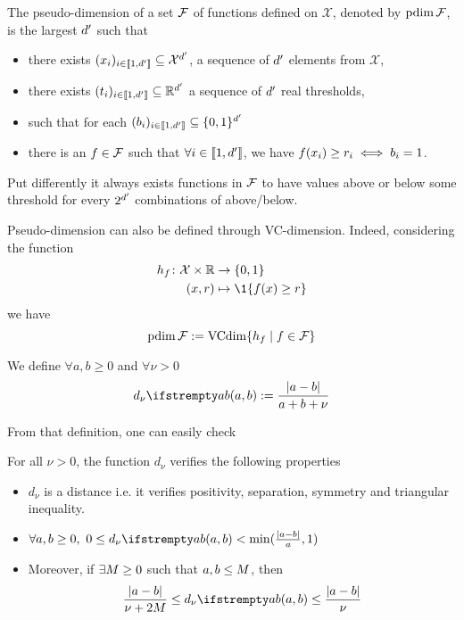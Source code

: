 \begin{tcolorbox}
	\begin{definition}
		The pseudo-dimension of a set $\mathcal{F}$ of functions defined on $\mathcal{X}$, denoted by $\operatorname{pdim}\mathcal{F}$, is the largest ${d^{\prime}}$ such that 
	\begin{itemize}
		\item there exists $(x_{i})_{i\in \llbracket 1,{d^{\prime}} \rrbracket} \subseteq \mathcal{X}^{d^{\prime}}$, a sequence of ${d^{\prime}}$ elements from $\mathcal{X}$,
		\item there exists $(t_i)_{i\in \llbracket 1,{d^{\prime}} \rrbracket} \subseteq  \mathbb{R}^{d^{\prime}}$ a sequence of ${d^{\prime}}$ real thresholds,
		\item such that for each $(b_i)_{i\in \llbracket 1,{d^{\prime}} \rrbracket} \subseteq \{0,1\}^{d^{\prime}}$
		\item there is an $f \in \mathcal{F}$ such that $\forall i \in \llbracket 1,{d^{\prime}} \rrbracket$, we have $f(x_i) \geq r_i \iff b_i = 1$. 
	\end{itemize}
	Put differently it always exists functions in $\mathcal{F}$ to have values above or below some threshold for every $2^{d^{\prime}}$ combinations of above/below.
\end{definition}
Pseudo-dimension can also be defined through VC-dimension. Indeed, considering the function
\begin{align*}
	h_\query \colon \mathcal{X} \times \RR &\to \{0,1\}\\
	(x,r) &\mapsto \1\{f(x) \geq r\}
\end{align*}
we have
\begin{equation}
	\operatorname{pdim}\mathcal{F} := \operatorname{VCdim}\{h_f \mid f \in \mathcal{F}\}
\end{equation}
\end{tcolorbox}




\begin{tcolorbox}[colback=red!10,title= Useless?]
	We define $\forall a,b \geq 0$ and $\forall \nu >0$
	\begin{equation}
		\dnu{\nu}{a}{b} := \frac{|a-b|}{a+b+\nu}
	\end{equation}
	
	From that definition, one can easily check
	\begin{proposition}
		\label{prop_dnu}
		For all $\nu>0$, the function $d_\nu$ verifies the following properties
		\begin{itemize}
			\item $d_\nu$ is a distance i.e. it verifies positivity, separation, symmetry and triangular inequality.
			\item $\forall a,b \geq 0,\ 0\leq \dnu{\nu}{a}{b} < \min( \frac{|a-b|}{a}, 1)$
			\item Moreover, if $\exists M\geq 0$ such that $a,b \le M$, then 
			\begin{equation*}
				\frac{|a-b|}{\nu + 2\bound} \le \dnu{\nu}{a}{b} \le \frac{|a-b|}{\nu}
			\end{equation*}
		\end{itemize}
	\end{proposition}
	\end{tcolorbox}




